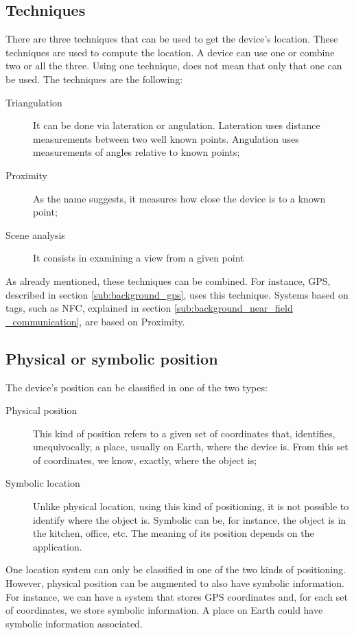 \subsection{Techniques}
\label{sub:background_techniques}
There are three techniques that can be used to get the device's location.
These techniques are used to compute the location.
A device can use one or combine two or all the three.
Using one technique, does not mean that only that one can be used.
The techniques are the following:
\begin{description}
  \item[Triangulation] It can be done via lateration or angulation. Lateration uses distance measurements between two well known points.
  Angulation uses measurements of angles relative to known points;
  \item[Proximity] As the name suggests, it measures how close the device is to a known point;
  \item[Scene analysis] It consists in examining a view from a given point
\end{description}

As already mentioned, these techniques can be combined.
For instance, \gls{GPS}, described in section \ref{sub:background_gps}, uses this technique.
Systems based on tags, such as \gls{NFC}, explained in section \ref{sub:background_near_field _communication}, are based on Proximity.

\subsection{Physical or symbolic position}
\label{sub:background_physical_or_symbolic_position}
The device's position can be classified in one of the two types:
\begin{description}
  \item[Physical position] This kind of position refers to a given set of coordinates that, identifies, unequivocally, a place, usually on Earth, where the device is. From this set of coordinates, we know, exactly, where the object is;
  \item[Symbolic location] Unlike physical location, using this kind of positioning, it is not possible to identify where the object is. Symbolic can be, for instance, the object is in the kitchen, office, etc. The meaning of its position depends on the application.
\end{description}

One location system can only be classified in one of the two kinds of positioning.
However, physical position can be augmented to also have symbolic information.
For instance, we can have a system that stores \gls{GPS} coordinates and, for each set of coordinates, we store symbolic information.
A place on Earth could have symbolic information associated.

